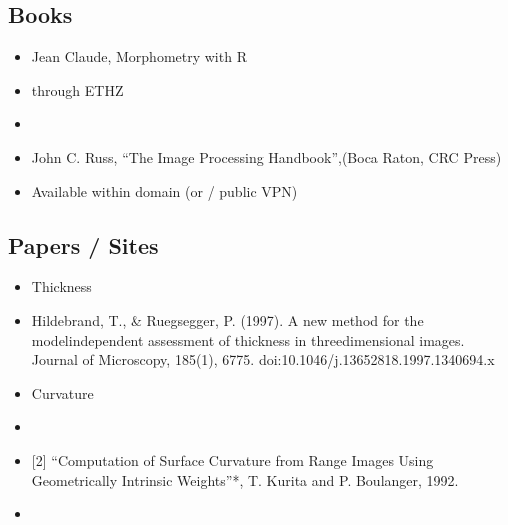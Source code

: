 \documentclass[letterpaper,10pt,english]{sphinxmanual}
\begin{document}
\subsection{Books}
\label{\detokenize{06-AdvancedShapeAndTexture:books}}\begin{itemize}
\item {} 
\sphinxAtStartPar
Jean Claude, Morphometry with R

\item {} 
\sphinxAtStartPar
{} through ETHZ

\item {} 
\sphinxAtStartPar
{}

\item {} 
\sphinxAtStartPar
John C. Russ, “The Image Processing Handbook”,(Boca Raton, CRC Press)

\item {} 
\sphinxAtStartPar
Available  within domain  (or  / public VPN)

\end{itemize}


\subsection{Papers / Sites}
\label{\detokenize{06-AdvancedShapeAndTexture:papers-sites}}\begin{itemize}
\item {} 
\sphinxAtStartPar
Thickness

\item {} 
\sphinxAtStartPar
{} Hildebrand, T., \& Ruegsegger, P. (1997). A new method for the model\sphinxhyphen{}independent assessment of thickness in three\sphinxhyphen{}dimensional images. Journal of Microscopy, 185(1), 67\textendash{}75. doi:10.1046/j.1365\sphinxhyphen{}2818.1997.1340694.x

\item {} 
\sphinxAtStartPar
Curvature

\item {} 
\sphinxAtStartPar
{}

\item {} 
\sphinxAtStartPar
{[}2{]} “Computation of Surface Curvature from Range Images Using Geometrically Intrinsic Weights”*, T. Kurita and P. Boulanger, 1992.

\item {} 
\sphinxAtStartPar
{}

\end{itemize}
\end{document}
